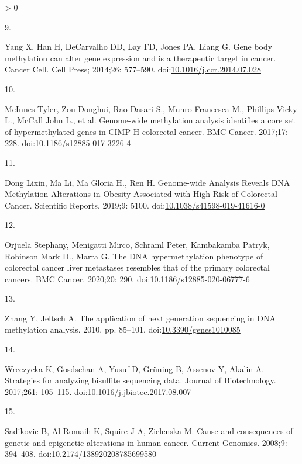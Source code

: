 \documentclass[10pt,letterpaper]{article}
\newlength{\csllabelwidth}
\newlength{\cslhangindent}
\newenvironment{CSLReferences}[2] %
 {%
  \setlength{\parindent}{0pt}
  \ifodd #1 \everypar{\setlength{\hangindent}{\cslhangindent}}\ignorespaces\fi
  \ifnum #2 > 0
  \setlength{\parskip}{#2\baselineskip}
  \fi
 }%
 {}
\newcommand{\CSLLeftMargin}[1]{\parbox[t]{\csllabelwidth}{#1}}
\newcommand{\CSLRightInline}[1]{\parbox[t]{\linewidth - \csllabelwidth}{#1}\break}
\begin{document}
\begin{CSLReferences}{0}{0}
\leavevmode\hypertarget{ref-Yang2014}{}%
\CSLLeftMargin{9. }
\CSLRightInline{Yang X, Han H, DeCarvalho DD, Lay FD, Jones PA, Liang G.
{Gene body methylation can alter gene expression and is a therapeutic
target in cancer}. Cancer Cell. Cell Press; 2014;26: 577--590.
doi:\href{https://doi.org/10.1016/j.ccr.2014.07.028}{10.1016/j.ccr.2014.07.028}}

\leavevmode\hypertarget{ref-McInnes2017}{}%
\CSLLeftMargin{10. }
\CSLRightInline{McInnes Tyler, Zou Donghui, Rao Dasari S., Munro
Francesca M., Phillips Vicky L., McCall John L., et al. {Genome-wide
methylation analysis identifies a core set of hypermethylated genes in
CIMP-H colorectal cancer}. BMC Cancer. 2017;17: 228.
doi:\href{https://doi.org/10.1186/s12885-017-3226-4}{10.1186/s12885-017-3226-4}}

\leavevmode\hypertarget{ref-Dong2019}{}%
\CSLLeftMargin{11. }
\CSLRightInline{Dong Lixin, Ma Li, Ma Gloria H., Ren H. {Genome-wide
Analysis Reveals DNA Methylation Alterations in Obesity Associated with
High Risk of Colorectal Cancer}. Scientific Reports. 2019;9: 5100.
doi:\href{https://doi.org/10.1038/s41598-019-41616-0}{10.1038/s41598-019-41616-0}}

\leavevmode\hypertarget{ref-Orjuela2020}{}%
\CSLLeftMargin{12. }
\CSLRightInline{Orjuela Stephany, Menigatti Mirco, Schraml Peter,
Kambakamba Patryk, Robinson Mark D., Marra G. {The DNA hypermethylation
phenotype of colorectal cancer liver metastases resembles that of the
primary colorectal cancers}. BMC Cancer. 2020;20: 290.
doi:\href{https://doi.org/10.1186/s12885-020-06777-6}{10.1186/s12885-020-06777-6}}

\leavevmode\hypertarget{ref-Zhang2010}{}%
\CSLLeftMargin{13. }
\CSLRightInline{Zhang Y, Jeltsch A. {The application of next generation
sequencing in DNA methylation analysis}. 2010. pp. 85--101.
doi:\href{https://doi.org/10.3390/genes1010085}{10.3390/genes1010085}}

\leavevmode\hypertarget{ref-Wreczycka2017}{}%
\CSLLeftMargin{14. }
\CSLRightInline{Wreczycka K, Gosdschan A, Yusuf D, Grüning B, Assenov Y,
Akalin A. {Strategies for analyzing bisulfite sequencing data}. Journal
of Biotechnology. 2017;261: 105--115.
doi:\href{https://doi.org/10.1016/j.jbiotec.2017.08.007}{10.1016/j.jbiotec.2017.08.007}}

\leavevmode\hypertarget{ref-Sadikovic2008}{}%
\CSLLeftMargin{15. }
\CSLRightInline{Sadikovic B, Al-Romaih K, Squire J A, Zielenska M. Cause
and consequences of genetic and epigenetic alterations in human cancer.
Current Genomics. 2008;9: 394--408.
doi:\href{https://doi.org/10.2174/138920208785699580}{10.2174/138920208785699580}}


\end{CSLReferences}
\end{document}
